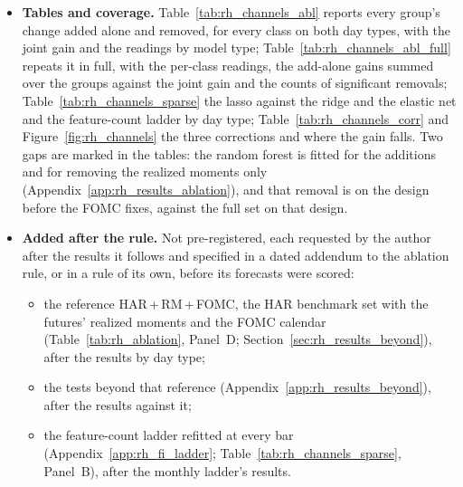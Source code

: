 \begin{itemize}
\begin{itemize}
    and elastic net.
  \item Reading: a shared factor if some $k \le 3$ has $R_k \ge \rhfaShareThreshold$ and a loss not significantly
    above the full set's; dense beyond a few factors if $R_{10} < \rhfaDenseThreshold$ and the full set beats the
    ten-component model significantly; intermediate otherwise. On ordinary days it is ``\rhfaReading''.
  \end{itemize}
\item \textbf{Tables and coverage.} Table~\ref{tab:rh_channels_abl} reports every group's change added alone and
  removed, for every class on both day types, with the joint gain and the readings by model type;
  Table~\ref{tab:rh_channels_abl_full} repeats it in full, with the per-class readings, the add-alone gains summed over
  the groups against the joint gain and the counts of significant removals; Table~\ref{tab:rh_channels_sparse}
  the lasso against the ridge and the elastic net and the feature-count ladder by day type;
  Table~\ref{tab:rh_channels_corr} and Figure~\ref{fig:rh_channels} the three corrections and where the gain falls.
  Two gaps are marked in the tables: the random forest is fitted for the additions and for removing the realized
  moments only (Appendix~\ref{app:rh_results_ablation}), and that removal is on the design before the FOMC fixes,
  against the full set on that design.
\item \textbf{Added after the rule.} Not pre-registered, each requested by the author after the results it follows and
  specified in a dated addendum to the ablation rule, or in a rule of its own, before its forecasts were scored:
  \begin{itemize}
  \item the reference HAR\,+\,RM\,+\,FOMC, the HAR benchmark set with the futures' realized moments and the FOMC
    calendar (Table~\ref{tab:rh_ablation}, Panel~D; Section~\ref{sec:rh_results_beyond}), after the results by day
    type;
  \item the tests beyond that reference (Appendix~\ref{app:rh_results_beyond}), after the results against it;
  \item the feature-count ladder refitted at every bar (Appendix~\ref{app:rh_fi_ladder};
    Table~\ref{tab:rh_channels_sparse}, Panel~B), after the monthly ladder's results.
  \end{itemize}
\end{itemize}
